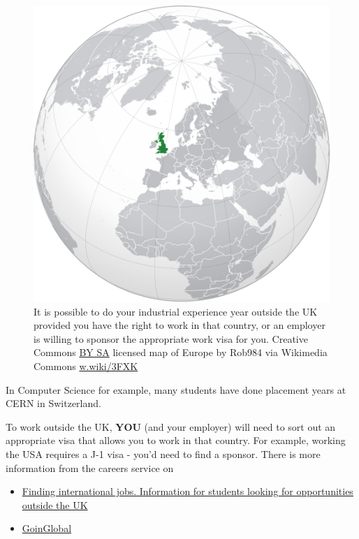 \documentclass[
]{book}
\providecommand{\tightlist}{%
  \setlength{\itemsep}{0pt}\setlength{\parskip}{0pt}}
\begin{document}
\begin{figure}

{\centering \includegraphics[width=0.9\linewidth]{images/outsideuk} 

}

\caption{It is possible to do your industrial experience year outside the UK provided you have the right to work in that country, or an employer is willing to sponsor the appropriate work visa for you. Creative Commons \href{https://creativecommons.org/licenses/by-sa/4.0/deed.en}{BY SA} licensed map of Europe by Rob984 via Wikimedia Commons \href{https://w.wiki/3FXK}{w.wiki/3FXK}}\label{fig:notuk-fig}
\end{figure}



In Computer Science for example, many students have done placement years at CERN in Switzerland. \citep{cern}

To work outside the UK, \textbf{YOU} (and your employer) will need to sort out an appropriate visa that allows you to work in that country. For example, working the USA requires a J-1 visa - you'd need to find a sponsor. There is more information from the careers service on

\begin{itemize}
\tightlist
\item
  \href{https://www.careers.manchester.ac.uk/international/internationaljobs/}{Finding international jobs. Information for students looking for opportunities outside the UK} \citep{interjobs}
\item
  \href{https://www.careers.manchester.ac.uk/international/goinglobal/}{GoinGlobal} \citep{goinglobal}
\end{itemize}
\end{document}
